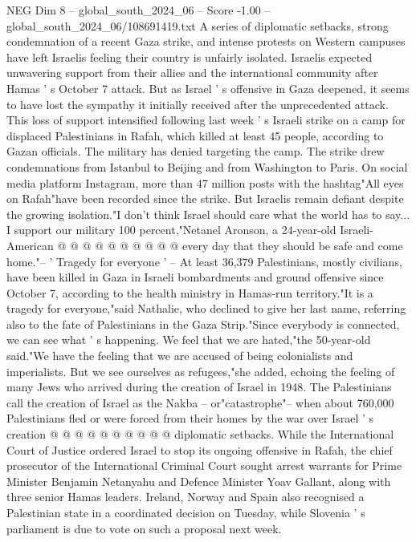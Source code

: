 \begin{textsample}{NEG Dim 8 – global\_south\_2024\_06 – Score -1.00 – global\_south\_2024\_06/108691419.txt}  \label{ex:f8_neg_047}
A series of diplomatic setbacks, strong condemnation of a recent Gaza strike, and intense protests on Western campuses have left Israelis feeling their country is unfairly isolated.
Israelis expected unwavering support from their allies and the international community after Hamas ' s October 7 attack.
But as Israel ' s offensive in Gaza deepened, it seems to have lost the sympathy it initially received after the unprecedented attack.
This loss of support intensified following last week ' s Israeli strike on a camp for displaced Palestinians in Rafah, which killed at least 45 people, according to Gazan officials.
The military has denied targeting the camp.
The strike drew condemnations from Istanbul to Beijing and from Washington to Paris.
On social media platform Instagram, more than 47 million posts with the hashtag"All eyes on Rafah"have been recorded since the strike.
But Israelis remain defiant despite the growing isolation."I don't think Israel should care what the world has to say...
I support our military 100 percent,"Netanel Aronson, a 24-year-old Israeli-American @ @ @ @ @ @ @ @ @ @ every day that they should be safe and come home."-- ' Tragedy for everyone ' -- At least 36,379 Palestinians, mostly civilians, have been killed in Gaza in Israeli bombardments and ground offensive since October 7, according to the health ministry in Hamas-run territory."It is a tragedy for everyone,"said Nathalie, who declined to give her last name, referring also to the fate of Palestinians in the Gaza Strip."Since everybody is connected, we can see what ' s happening.
We feel that we are hated,"the 50-year-old said."We have the feeling that we are accused of being colonialists and imperialists.
But we see ourselves as refugees,"she added, echoing the feeling of many Jews who arrived during the creation of Israel in 1948.
The Palestinians call the creation of Israel as the Nakba -- or"catastrophe"-- when about 760,000 Palestinians fled or were forced from their homes by the war over Israel ' s creation @ @ @ @ @ @ @ @ @ @ diplomatic setbacks.
While the International Court of Justice ordered Israel to stop its ongoing offensive in Rafah, the chief prosecutor of the International Criminal Court sought arrest warrants for Prime Minister Benjamin Netanyahu and Defence Minister Yoav Gallant, along with three senior Hamas leaders.
Ireland, Norway and Spain also recognised a Palestinian state in a coordinated decision on Tuesday, while Slovenia ' s parliament is due to vote on such a proposal next week.

\end{textsample}
